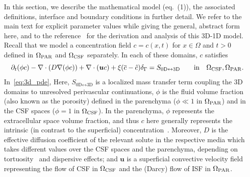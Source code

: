 \documentclass[fleqn,10pt]{wlscirep}
\begin{document}
In this section, we describe the mathematical model (eq.~(1)), the
associated definitions, interface and boundary conditions in further
detail. We refer to the main text for explicit parameter values while
giving the general, abstract form here, and to the
reference~\cite{masri2024modelling, laurino2019derivation} for the
derivation and analysis of this 3D-1D model. Recall that we model a
concentration field $c = c(x, t)$ for $x \in \Omega$ and $t > 0$
defined in $\Omega_{\rm PAR}$ and $\Omega_{\rm CSF}$ separately. In
each of these domains, $c$ satisfies
\begin{equation}
  \partial_t (\phi c) - \nabla \cdot (D \nabla (\phi c) ) + \nabla \cdot (\bm u c ) + \xi (\overline{c} - \hat c ) \delta_\Gamma
   = S_{\text{0D} \leftrightarrow \text{3D}}
  \quad \quad \mathrm{in} \quad \Omega_{\rm CSF}, \Omega_{\rm{PAR}}.
  \label{eq:3d_pde}
\end{equation}
In~\eqref{eq:3d_pde}, Here, $S_{\text{0D} \leftrightarrow \text{3D}}$ is a localized mass transfer term coupling the 3D domains to unresolved perivascular continuations, $\phi$ is the fluid volume fraction (also known as the porosity) defined in the parenchyma ($\phi \ll 1$ in $\Omega_{\rm PAR}$) and in the CSF spaces ($\phi = 1$ in $\Omega_{\rm CSF}$). In the parenchyma, $\phi$ represents the extracellular space volume fraction, and thus $c$ here generally represents the intrinsic (in contrast to the superficial) concentration~\cite{sykova2008diffusion}. Moreover, $D$ is the effective diffusion coefficient of the relevant solute in the respective media which takes different values over the CSF spaces and the parenchyma, depending on tortuosity~\cite{sykova2008diffusion} and dispersive effects; and $\bm u$ is a superficial convective velocity field representing the flow of CSF in $\Omega_{\rm CSF}$ and the (Darcy) flow of ISF in $\Omega_{\rm PAR}$.
\end{document}
